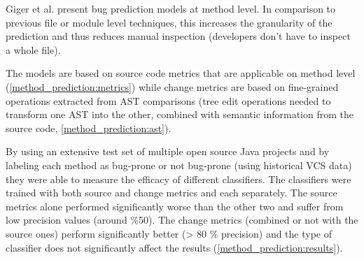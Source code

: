  Giger et al. \cite{prediction_method} present bug prediction models at method level. In comparison to previous file or module level techniques, this increases the granularity of the prediction and thus reduces manual inspection (developers don't have to inspect a whole file). 

 The models are based on source code metrics that are applicable on method level (\cref{method_prediction:metrics}) while change metrics are based on fine-grained operations extracted from AST comparisons (tree edit operations needed to transform one AST into the other, combined with semantic information from the source code, \cref{method_prediction:ast}).

 By using an extensive test set of multiple open source Java projects and by labeling each method as bug-prone or not bug-prone (using historical VCS data) they were able to measure the efficacy of different classifiers. The classifiers were trained with both source and change metrics and each separately. The source metrics alone performed significantly worse than the other two and suffer from low precision values (around \%50). The change metrics (combined or not with the source ones) perform significantly better (> 80 \% precision) and the type of classifier does not significantly affect the results (\cref{method_prediction:results}).

